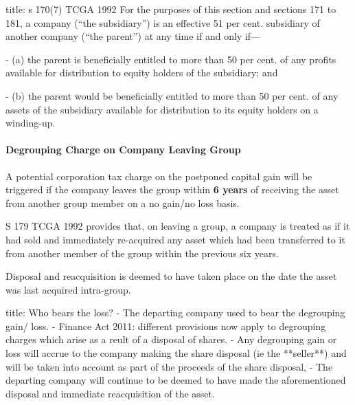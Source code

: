 \documentclass[
]{article}
\newenvironment{Shaded}{}{}
\newcommand{\NormalTok}[1]{#1}
\begin{document}
\begin{Shaded}
\begin{Highlighting}[]
\NormalTok{title: s 170(7) TCGA 1992}
\NormalTok{For the purposes of this section and sections 171 to 181, a company (“the subsidiary”) is an effective 51 per cent. subsidiary of another company (“the parent”) at any time if and only if—}

\NormalTok{{-} (a) the parent is beneficially entitled to more than 50 per cent. of any profits available for distribution to equity holders of the subsidiary; and}

\NormalTok{{-} (b) the parent would be beneficially entitled to more than 50 per cent. of any assets of the subsidiary available for distribution to its equity holders on a winding{-}up.}
\end{Highlighting}
\end{Shaded}

\hypertarget{degrouping-charge-on-company-leaving-group}{%
\paragraph{Degrouping Charge on Company Leaving
Group}\label{degrouping-charge-on-company-leaving-group}}

A potential corporation tax charge on the postponed capital gain will be
triggered if the company leaves the group within \textbf{6 years} of
receiving the asset from another group member on a no gain/no loss
basis.

S 179 TCGA 1992 provides that, on leaving a group, a company is treated
as if it had sold and immediately re-acquired any asset which had been
transferred to it from another member of the group within the previous
six years.

Disposal and reacquisition is deemed to have taken place on the date the
asset was last acquired intra-group.

\begin{Shaded}
\begin{Highlighting}[]
\NormalTok{title: Who bears the loss?}
\NormalTok{{-} The departing company used to bear the degrouping gain/ loss. }
\NormalTok{{-} Finance Act 2011: different provisions now apply to degrouping charges which arise as a reult of a disposal of shares. }
\NormalTok{{-} Any degrouping gain or loss will accrue to the company making the share disposal (ie the **seller**) and will be taken into account as part of the proceeds of the share disposal,}
\NormalTok{{-} The departing company will continue to be deemed to have made the aforementioned disposal and immediate reacquisition of the asset.}
\end{Highlighting}
\end{Shaded}
\end{document}

